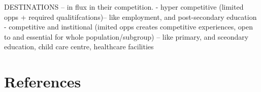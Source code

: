 \documentclass[
11pt, %
oneside, %
english, %
singlespacing, %
]{macthesis} %
\begin{document}
DESTINATIONS -- in flux in their competition.
- hyper competitive (limited opps + required qualitifcations)-- like employment, and post-secondary education
- competitive and institional (imited opps creates competitive experiences, open to and essential for whole population/subgroup) -- like primary, and sceondary education, child care centre, healthcare facilities

\backmatter

\chapter*{References}\label{references}


\noindent

\setlength{\parindent}{-0.20in}
\setlength{\leftskip}{0.20in}
\setlength{\parskip}{8pt}
\end{document}
